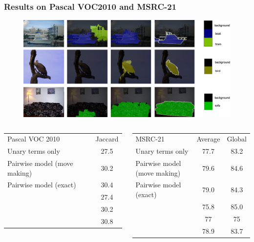 \documentclass[final,ignorenonframetext,compress]{beamer}
\begin{document}
\begin{frame}
    \frametitle{Results on Pascal VOC2010 and MSRC-21}
    \begin{figure}
        \centering
        \includegraphics[width=.8\linewidth]{images/results_pascal}
    \end{figure}
    \vspace{-10mm}
    \tiny
    \begin{columns}[t]
        \begin{table}
                \begin{tabular}{lc}
                    \toprule
                    Pascal VOC 2010& Jaccard \\
                    \cmidrule{1-2}
                    Unary terms only &  27.5 \\
                    Pairwise model (move making)& 30.2\\
                    Pairwise model (exact) & 30.4\\
                    \cmidrule{1-2}
                    \citet{dann2012pottics} & 27.4\\
                    \citet{krahenbuhl2012efficient} & 30.2\\
                    \citet{krahenbuhlparameter} & 30.8\\
                    \bottomrule
                \end{tabular}
        \end{table}
        \begin{table}
                \begin{tabular}{lcc}
                    \toprule
                    MSRC-21 & Average & Global \\
                    \cmidrule{1-3}
                    Unary terms only & 77.7& 83.2 \\
                    Pairwise model (move making)& 79.6&84.6\\
                    Pairwise model (exact)& 79.0 & 84.3\\
                    \cmidrule{1-3}
                    \citet{ladicky2009associative} & 75.8& 85.0\\
                    \citet{gonfaus2010harmony} & 77&  75\\
                    \citet{lucchi2013learning} & 78.9& 83.7\\
                    \bottomrule
                \end{tabular}

        \end{table}
    \end{columns}
\end{frame}
\end{document}
